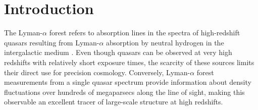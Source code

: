\documentclass[longauth]{aa}
\newcommand{\lya}{Lyman-$\alpha$\xspace}
\newcommand{\lyaf}{Lyman-$\alpha$ forest\xspace}
\begin{document}


\maketitle



\section{Introduction}

The \lyaf refers to absorption lines in the spectra of high-redshift quasars resulting from \lya absorption by neutral hydrogen in the intergalactic medium \citep[IGM; for a review, see][]{mcquinn2016EvolutionIntergalacticMedium}. Even though quasars can be observed at very high redshifts with relatively short exposure times, the scarcity of these sources limits their direct use for precision cosmology. Conversely, \lyaf measurements from a single quasar spectrum provide information about density fluctuations over hundreds of megaparsecs along the line of sight, making this observable an excellent tracer of large-scale structure at high redshifts.
\end{document}
